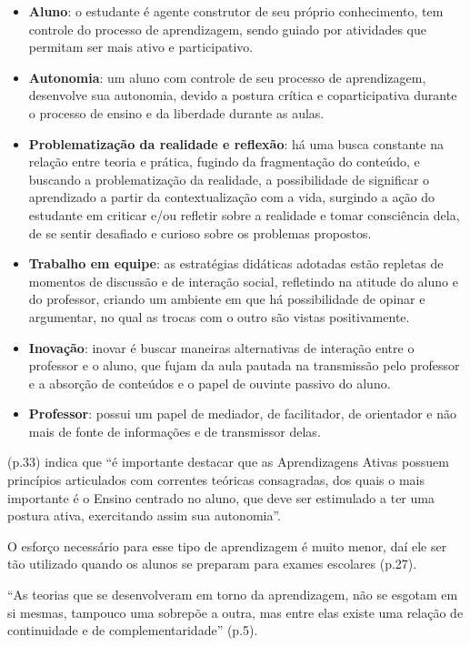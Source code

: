 \begin{itemize}
    \item \textbf{Aluno}: o estudante é agente construtor de seu próprio conhecimento, tem controle do processo de aprendizagem, sendo guiado por atividades que permitam ser mais ativo e participativo.
    \item \textbf{Autonomia}: um aluno com controle de seu processo de aprendizagem, desenvolve sua autonomia, devido a postura crítica e coparticipativa durante o processo de ensino e da liberdade durante as aulas.
    \item \textbf{Problematização da realidade e reflexão}: há uma busca constante na relação entre teoria e prática, fugindo da fragmentação do conteúdo, e buscando a problematização da realidade, a possibilidade de significar o aprendizado a partir da contextualização com a vida, surgindo a ação do estudante em criticar e/ou refletir sobre a realidade e tomar consciência dela, de se sentir desafiado e curioso sobre os problemas propostos.
    \item \textbf{Trabalho em equipe}: as estratégias didáticas adotadas estão repletas de momentos de discussão e de interação social, refletindo na atitude do aluno e do professor, criando um ambiente em que há possibilidade de opinar e argumentar, no qual as trocas com o outro são vistas positivamente.
    \item \textbf{Inovação}: inovar é buscar maneiras alternativas de interação entre o professor e o aluno, que fujam da aula pautada na transmissão pelo professor e a absorção de conteúdos e o papel de ouvinte passivo do aluno.
    \item \textbf{Professor}: possui um papel de mediador, de facilitador, de orientador e não mais de fonte de informações e de transmissor delas.
\end{itemize}

 (p.33) indica que ``é importante destacar que as Aprendizagens Ativas possuem princípios articulados com correntes teóricas consagradas, dos quais o mais importante é o Ensino centrado no aluno, que deve ser estimulado a ter uma postura ativa, exercitando assim sua autonomia''.

O esforço necessário para esse tipo de aprendizagem é muito menor, daí ele ser tão utilizado quando os alunos se preparam para exames escolares \cite{SOUSA2022} (p.27).

``As teorias que se desenvolveram em torno da aprendizagem, não se esgotam em si mesmas, tampouco uma sobrepõe a outra, mas entre elas existe uma relação de continuidade e de complementaridade'' \cite{LACERDA2023} (p.5).

